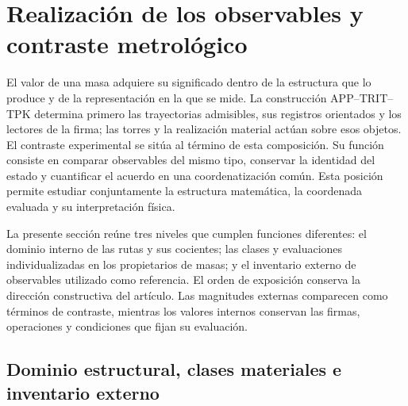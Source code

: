 
\section{Realización de los observables y contraste metrológico}
\label{sec:vi-contraste-metrologico}

El valor de una masa adquiere su significado dentro de la estructura que lo
produce y de la representación en la que se mide. La construcción
APP--TRIT--TPK determina primero las trayectorias admisibles, sus registros
orientados y los lectores de la firma; las torres y la realización material
actúan sobre esos objetos. El contraste experimental se sitúa al término de
esta composición. Su función consiste en comparar observables del mismo
tipo, conservar la identidad del estado y cuantificar el acuerdo en una
coordenatización común. Esta posición permite estudiar conjuntamente la estructura
matemática, la coordenada evaluada y su interpretación física.

La presente sección reúne tres niveles que cumplen funciones diferentes:
el dominio interno de las rutas y sus cocientes; las clases y evaluaciones
individualizadas en los propietarios de masas; y el inventario externo de
observables utilizado como referencia. El orden de exposición conserva la
dirección constructiva del artículo. Las magnitudes externas comparecen como
términos de contraste, mientras los valores internos conservan las firmas,
operaciones y condiciones que fijan su evaluación.

\subsection{Dominio estructural, clases materiales e inventario externo}
\label{subsec:vi-dominios-contraste}

